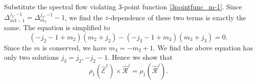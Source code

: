 \documentclass[10pt,a4paper]{article}
\numberwithin{equation}{section}
\begin{document}
Substitute the spectral flow violating 3-point function \eqref{3pointfunc_m-1}. 
Since $\Delta^{j_{3},-1}_{m3-1} = \Delta^{j_{3},-1}_{m_{3}} - 1$, we find the $z$-dependence of these two terms is exactly the same. 
The equation is simplified to 
\begin{equation}
    (-j_{2}-1+m_{2}) (m_{2}+j_{2}) - (-j_{3}-1+m_{3}) (m_{3}+j_{3}) = 0.
\end{equation}
Since the $m$ is conserved, we have $m_{3} = -m_{2} + 1$. We find the above equation has only two solutions $j_{3} = j_{2}, -j_{2}-1$. 
Hence we show that 
\begin{equation}
    \rho_{1} \left(\widehat{\mathcal{E}}^{1}\right) \times \widehat{\mathcal{R}}^{j} = \rho_{1} \left( \hat{\mathcal{R}}^{j} \right).
\end{equation}
\end{document}
